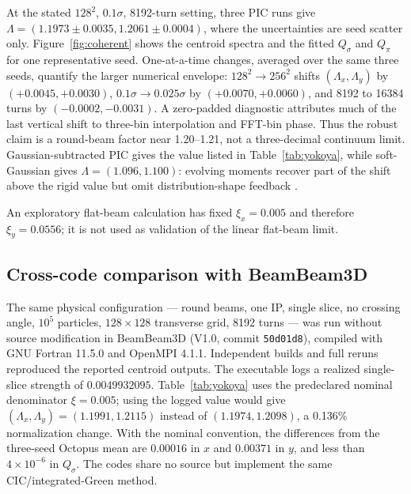 \documentclass[a4paper,fleqn]{cas-sc}
\newcommand{\code}[1]{\texttt{#1}}
\begin{document}
At the stated $128^2$, $0.1\sigma$, 8192-turn setting, three PIC runs give
$\Lambda=(1.1973\pm0.0035,1.2061\pm0.0004)$, where the uncertainties are seed
scatter only.  Figure~\ref{fig:coherent} shows the centroid spectra and the
fitted $Q_\sigma$ and $Q_\pi$ for one representative seed.  One-at-a-time changes, averaged over the same three seeds, quantify the
larger numerical
envelope: $128^2\!\rightarrow256^2$ shifts $(\Lambda_x,\Lambda_y)$ by
$(+0.0045,+0.0030)$, $0.1\sigma\!\rightarrow0.025\sigma$ by
$(+0.0070,+0.0060)$, and 8192 to 16384 turns by
$(-0.0002,-0.0031)$.  A zero-padded diagnostic attributes much of the last
vertical shift to three-bin interpolation and FFT-bin phase.  Thus the robust
claim is a round-beam factor near 1.20--1.21, not a three-decimal continuum
limit.  Gaussian-subtracted PIC gives the value listed in
Table~\ref{tab:yokoya}, while soft-Gaussian gives
$\Lambda=(1.096,1.100)$: evolving moments recover part
of the shift above the rigid value but omit distribution-shape feedback
\citep{Yokoya2000}.

An exploratory flat-beam calculation has fixed $\xi_x=0.005$ and therefore
$\xi_y=0.0556$; it is not used as validation of the linear flat-beam limit.

\subsection{Cross-code comparison with BeamBeam3D}
\label{sec:bb3d}

The same physical configuration --- round beams, one IP, single slice, no
crossing angle, $10^5$ particles, $128\times128$ transverse grid, 8192 turns
--- was run without source modification in BeamBeam3D
\citep{Qiang2004BeamBeam3D} (V1.0, commit \code{50d01d8}), compiled with GNU
Fortran 11.5.0 and OpenMPI 4.1.1.
Independent builds and full reruns reproduced the reported centroid outputs.
The executable
logs a realized single-slice strength of $0.0049932095$.  Table~\ref{tab:yokoya}
uses the predeclared nominal denominator $\xi=0.005$; using the logged value
would give $(\Lambda_x,\Lambda_y)=(1.1991,1.2115)$ instead of
$(1.1974,1.2098)$, a 0.136\% normalization change.  With the nominal convention,
the differences from the three-seed Octopus mean are $0.00016$ in $x$ and
$0.00371$ in $y$, and less than $4\times10^{-6}$ in $Q_\sigma$.  The codes
share no source but implement the same CIC/integrated-Green method.
\end{document}
